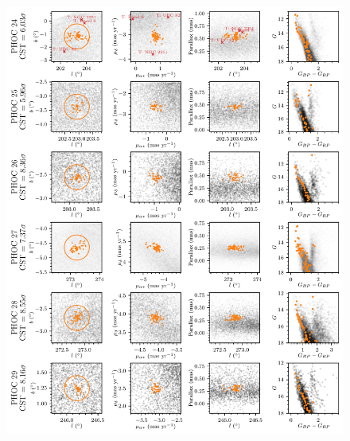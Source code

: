 \begin{figure}[ht]
   \centering
   \includegraphics[width=\textwidth]{fig/c2/fig_new_ocs_4.pdf}
   \caption[Plots of the new OCs PHOC 24 to 29]{}%
   \label{app:c2:fig:new_ocs_4}
\end{figure}

